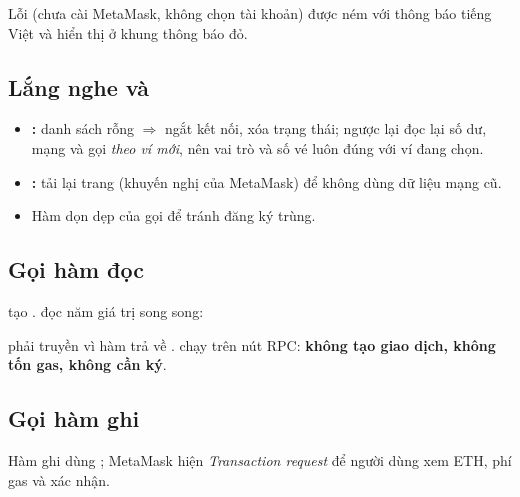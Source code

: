 Lỗi (chưa cài MetaMask, không chọn tài khoản) được ném với thông báo tiếng Việt và hiển thị ở khung thông báo đỏ.

\subsection{Lắng nghe  và }



\begin{itemize}[leftmargin=1.5em]
    \item \textbf{:} danh sách rỗng $\Rightarrow$ ngắt kết nối, xóa trạng thái; ngược lại đọc lại số dư, mạng và
          gọi  \emph{theo ví mới}, nên vai trò và số vé luôn đúng với ví đang chọn.
    \item \textbf{:} tải lại trang (khuyến nghị của MetaMask) để không dùng dữ liệu mạng cũ.
    \item Hàm dọn dẹp của  gọi  để tránh đăng ký trùng.
\end{itemize}

\subsection{Gọi hàm đọc}

 tạo .  đọc năm giá trị song song:



 phải truyền  vì hàm trả về .
 chạy trên nút RPC: \textbf{không tạo giao dịch, không tốn gas, không cần ký}.

\subsection{Gọi hàm ghi}

Hàm ghi dùng ; MetaMask hiện \emph{Transaction request} để người dùng xem ETH, phí gas và xác nhận.




